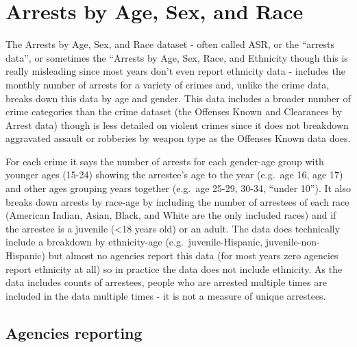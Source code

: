 \documentclass[
  12pt,
  openany]{book}
\begin{document}
\chapter{Arrests by Age, Sex, and Race}\label{arrests}

The Arrests by Age, Sex, and Race dataset - often called ASR, or the ``arrests data'', or sometimes the ``Arrests by Age, Sex, Race, and Ethnicity though this is really misleading since most years don't even report ethnicity data - includes the monthly number of arrests for a variety of crimes and, unlike the crime data, breaks down this data by age and gender. This data includes a broader number of crime categories than the crime dataset (the Offenses Known and Clearances by Arrest data) though is less detailed on violent crimes since it does not breakdown aggravated assault or robberies by weapon type as the Offenses Known data does.

For each crime it says the number of arrests for each gender-age group with younger ages (15-24) showing the arrestee's age to the year (e.g.~age 16, age 17) and other ages grouping years together (e.g.~age 25-29, 30-34, ``under 10''). It also breaks down arrests by race-age by including the number of arrestees of each race (American Indian, Asian, Black, and White are the only included races) and if the arrestee is a juvenile (\textless18 years old) or an adult. The data does technically include a breakdown by ethnicity-age (e.g.~juvenile-Hispanic, juvenile-non-Hispanic) but almost no agencies report this data (for most years zero agencies report ethnicity at all) so in practice the data does not include ethnicity. As the data includes counts of arrestees, people who are arrested multiple times are included in the data multiple times - it is not a measure of unique arrestees.

\section{Agencies reporting}\label{agencies-reporting-1}
\end{document}
